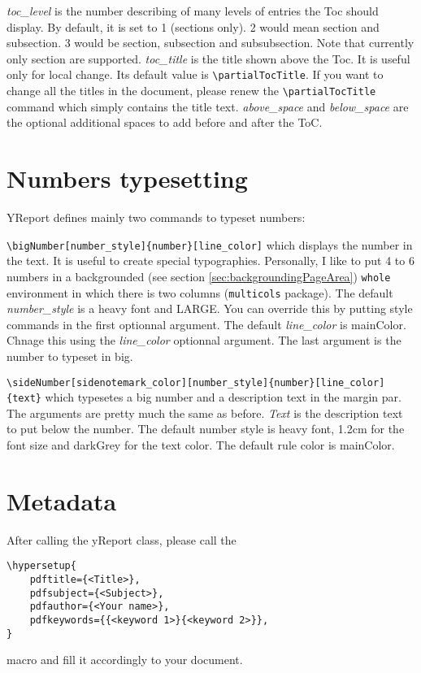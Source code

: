 \documentclass[a4paper, 11pt, oneside, fleqn]{article}
\begin{document}
	\textit{toc\_level} is the number describing of many levels of entries the Toc should display. By default, it is set to 1 (sections only). 2 would mean section and subsection. 3 would be section, subsection and subsubsection. Note that currently only section are supported. \textit{toc\_title} is the title shown above the Toc. It is useful only for local change. Its default value is \lstinline|\partialTocTitle|. If you want to change all the titles in the document, please renew the \lstinline|\partialTocTitle| command which simply contains the title text. \textit{above\_space} and \textit{below\_space} are the optional additional spaces to add before and after the ToC.
	
	\section{Numbers typesetting}
	YReport defines mainly two commands to typeset numbers:
	
	\lstinline[breaklines]|\bigNumber[number_style]{number}[line_color]| which displays the number in the text. It is useful to create special typographies. Personally, I like to put 4 to 6 numbers in a backgrounded (see section \ref{sec:backgroundingPageArea}) \lstinline|whole| environment in which there is two columns (\lstinline|multicols| package). The default \textit{number\_style} is a heavy font and LARGE. You can override this by putting style commands in the first optionnal argument. The default \textit{line\_color} is mainColor. Chnage this using the \textit{line\_color} optionnal argument. The last argument is the number to typeset in big.
	
	\lstinline[breaklines]|\sideNumber[sidenotemark_color][number_style]{number}[line_color]{text}| which typesetes a big number and a description text in the margin par. The arguments are pretty much the same as before. \textit{Text} is the description text to put below the number. The default number style is heavy font, 1.2cm for the font size and darkGrey for the text color. The default rule color is mainColor.
	
	\section{Metadata}
	After calling the yReport class, please call the
	
	\begin{lstlisting}
\hypersetup{
	pdftitle={<Title>},
	pdfsubject={<Subject>},
	pdfauthor={<Your name>},
	pdfkeywords={{<keyword 1>}{<keyword 2>}},
}
	\end{lstlisting}
	macro and fill it accordingly to your document.
	
\end{document}
